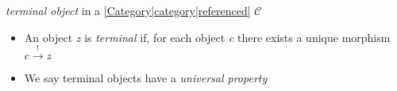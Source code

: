 
\emph{terminal object} in a \ref{Category|category|referenced} $\mathcal{C}$

\begin{itemize}
    \item  An object \emph{z} is \emph{terminal} if, for each object \emph{c} there exists a unique morphism $c \xrightarrow{!} z$
    \item We say terminal objects have a \emph{universal property}
  \end{itemize}
